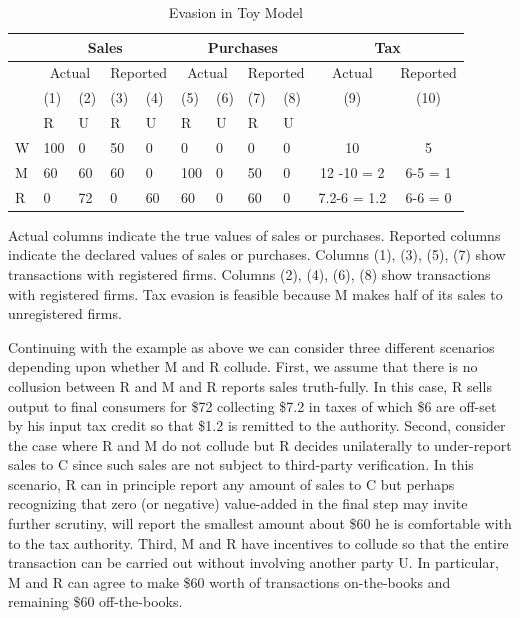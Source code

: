 \begin{table}[h]
\begin{threeparttable}
\caption{Evasion in Toy Model}
\begin{tabular}{|l|l|l|l|l|l|l|l|l|c|c|}
\hline
& \multicolumn{4}{|c|}{Sales} & \multicolumn{4}{|c|}{Purchases} & \multicolumn{2}{|c|}{Tax} \\ \hline
& \multicolumn{2}{|c|}{Actual} & \multicolumn{2}{|c|}{Reported} & \multicolumn{2}{|c|}{Actual} & \multicolumn{2}{|c|}{Reported} & Actual & Reported \\ \hline
& (1) & (2) & (3) & (4) & (5) & (6) & (7) & (8) & (9) & (10) \\ \hline
& R & U & R & U & R & U & R & U & & \\ \hline
W & 100 &0 & 50 & 0 & 0 & 0 & 0 & 0 & 10&5 \\ \hline
M & 60 & 60 & 60 & 0 & 100 & 0 & 50 & 0 & 12 -10 = 2 & 6-5 = 1\\ \hline 
R & 0 & 72 & 0 & 60 & 60 & 0 & 60 & 0 & 7.2-6 = 1.2 & 6-6 = 0 \\ \hline
\end{tabular}
\begin{tablenotes}
Actual columns indicate the true values of sales or purchases. Reported columns indicate the declared values of sales or purchases. Columns (1), (3), (5), (7) show transactions with registered firms. Columns (2), (4), (6), (8) show transactions with registered firms. Tax evasion is feasible because M makes half of its sales to unregistered firms.   
\end{tablenotes}
\label{tbl:evasion-desc}
\end{threeparttable}
\end{table}


Continuing with the example as above we can consider three different scenarios depending upon whether M and R collude.  First, we assume that there is no collusion between R and M and R reports sales truth-fully. In this case, R sells output to final consumers for \$72 collecting \$7.2 in taxes of which \$6 are off-set by his input tax credit so that \$1.2 is remitted to the authority. Second, consider the case where R and M do not collude but R decides unilaterally to under-report sales to C since such sales are not subject to third-party verification. In this scenario, R can in principle report any amount of sales to C but perhaps recognizing that zero (or negative) value-added in the final step may invite further scrutiny, will report the smallest amount about \$60 he is comfortable with to the tax authority. Third, M and R have incentives to collude so that the entire transaction can be carried out without involving another party U. In particular, M and R can agree to make \$60 worth of transactions on-the-books and remaining \$60 off-the-books.

